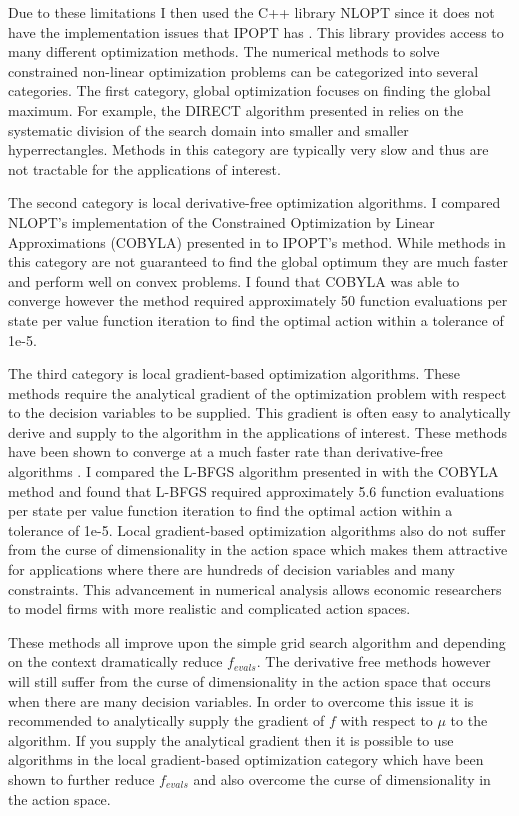\documentclass[12pt]{article}
\begin{document}
Due to these limitations I then used the C++ library NLOPT since it does not have the implementation issues that IPOPT has \citep{nlopt}. This library provides access to many different optimization methods. The numerical methods to solve constrained non-linear optimization problems can be categorized into several categories. The first category, global optimization focuses on finding the global maximum. For example, the DIRECT algorithm presented in \cite{direct} relies on the systematic division of the search domain into smaller and smaller hyperrectangles. Methods in this category are typically very slow and thus are not tractable for the applications of interest.

The second category is local derivative-free optimization algorithms. I compared NLOPT's implementation of the Constrained Optimization by Linear Approximations (COBYLA) presented in \citep{cobyla1, cobyla2} to IPOPT's method. While methods in this category are not guaranteed to find the global optimum they are much faster and perform well on convex problems. I found that COBYLA was able to converge however the method required approximately 50 function evaluations per state per value function iteration to find the optimal action within a tolerance of 1e-5.

The third category is local gradient-based optimization algorithms. These methods require the analytical gradient of the optimization problem with respect to the decision variables to be supplied. This gradient is often easy to analytically derive and supply to the algorithm in the applications of interest. These methods have been shown to converge at a much faster rate than derivative-free algorithms \citep{friendly}. I compared the L-BFGS algorithm presented in \citep{bfgs1, bfgs2} with the COBYLA method and found that L-BFGS required approximately 5.6 function evaluations per state per value function iteration to find the optimal action within a tolerance of 1e-5. Local gradient-based optimization algorithms also do not suffer from the curse of dimensionality in the action space which makes them attractive for applications where there are hundreds of decision variables and many constraints. This advancement in numerical analysis allows economic researchers to model firms with  more realistic and complicated action spaces.

These methods all improve upon the simple grid search algorithm and depending on the context dramatically reduce $f_{evals}$. The derivative free methods however will still suffer from the curse of dimensionality in the action space that occurs when there are many decision variables. In order to overcome this issue it is recommended to analytically supply the gradient of $f$ with respect to $\mu$ to the algorithm. If you supply the analytical gradient then it is possible to use algorithms in the local gradient-based optimization category which have been shown to further reduce $f_{evals}$ and also overcome the curse of dimensionality in the action space.
\end{document}
